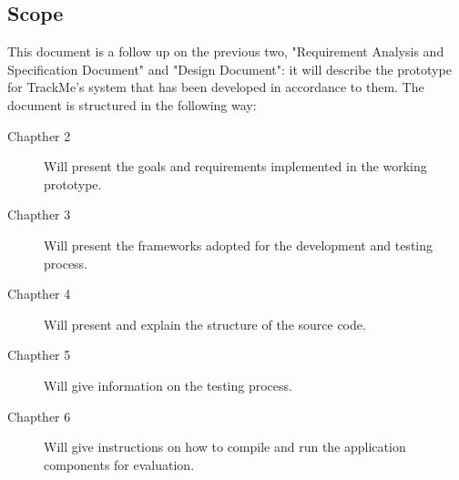 \documentclass[../main.tex]{subfiles}
\begin{document}
\subsection{Scope}
This document is a follow up on the previous two, "Requirement Analysis and Specification Document" and "Design Document": it will describe the prototype for TrackMe's system that has been developed in accordance to them.
\newline
\newline The document is structured in the following way:
\begin{description}

\item [Chapther 2] Will present the goals and requirements implemented in the working prototype.

\item [Chapther 3] Will present the frameworks adopted for the development and testing process.

\item [Chapther 4] Will present and explain the structure of the source code.

\item [Chapther 5] Will give information on the testing process.

\item [Chapther 6] Will give instructions on how to compile and run the application components for evaluation.

\end{description}
\end{document}
